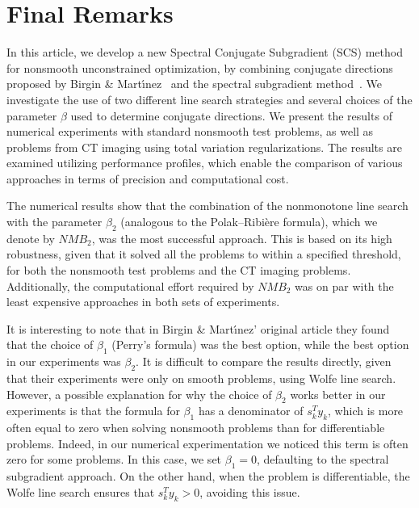 \documentclass[]{interact}
\theoremstyle{plain}%
\theoremstyle{definition}
\theoremstyle{remark}
\begin{document}
\section{Final Remarks}
\label{S:conclusions}
In this article, we develop a new Spectral Conjugate Subgradient (SCS) method for nonsmooth unconstrained optimization, by combining conjugate directions proposed by Birgin \& Mart\'{\i}nez~\cite{Bm01} and the spectral subgradient method~\cite{Loreto:19}. We investigate the use of two different line search strategies and several choices of the parameter $\beta$ used to determine conjugate directions. We present the results of numerical experiments with standard nonsmooth test problems, as well as problems from CT imaging using total variation regularizations. {The results are examined utilizing performance profiles, which enable the comparison of various approaches in terms of precision and computational cost.}

The numerical results show that the combination of the nonmonotone line search with the parameter $\beta_2$ (analogous to the Polak–Ribi\`ere formula), which we denote by $NMB_2$, was the most successful approach. This is based on its high robustness, given that it solved all the problems to within a specified threshold, for both the nonsmooth test problems and the CT imaging problems. Additionally, the computational effort required by $NMB_2$ was on par with the least expensive approaches in both sets of experiments.

It is interesting to note that in Birgin \& Mart\'{\i}nez' original article they found that the choice of $\beta_1$ (Perry's formula) was the best option, while the best option in our experiments was $\beta_2$. It is difficult to compare the results directly, given that their experiments were only on smooth problems, using Wolfe line search. However, a possible explanation for why the choice of $\beta_2$ works better in our experiments is that the formula for $\beta_1$ has a denominator of $s_k^Ty_k$, which is more often equal to zero when solving nonsmooth problems than for differentiable problems. Indeed, in our numerical experimentation we noticed this term is often zero for some problems. In this case, we set $\beta_1 = 0$, defaulting to the spectral subgradient approach. On the other hand, when the problem is differentiable, the Wolfe line search ensures that $s_k^Ty_k > 0$, avoiding this issue.

\end{document}
